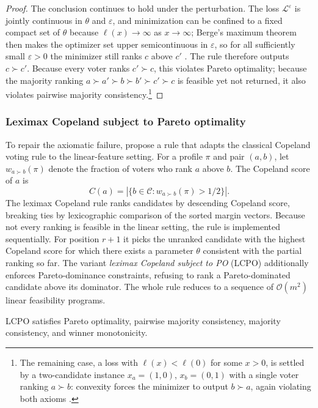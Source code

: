 \begin{proof}
The conclusion continues to hold under the perturbation. The loss $\mathcal{L}^{\varepsilon}$ is jointly continuous in $\theta$ and $\varepsilon$, and minimization can be confined to a fixed compact set of $\theta$ because $\ell(x) \to \infty$ as $x \to \infty$; Berge's maximum theorem then makes the optimizer set upper semicontinuous in $\varepsilon$, so for all sufficiently small $\varepsilon > 0$ the minimizer still ranks $c$ above $c'$ \citep[Lemmas~3.4--3.5]{ge2024axioms}. The rule therefore outputs $c \succ c'$. Because every voter ranks $c' \succ c$, this violates Pareto optimality; because the majority ranking $a \succ a' \succ b \succ b' \succ c' \succ c$ is feasible yet not returned, it also violates pairwise majority consistency.\footnote{The remaining case, a loss with $\ell(x) < \ell(0)$ for some $x > 0$, is settled by a two-candidate instance $x_a = (1,0)$, $x_b = (0,1)$ with a single voter ranking $a \succ b$: convexity forces the minimizer to output $b \succ a$, again violating both axioms \citep{ge2024axioms}.}
\end{proof}

\subsubsection{Leximax Copeland subject to Pareto optimality}
\label{sec:lcpo}

To repair the axiomatic failure, \citet{ge2024axioms} propose a rule that adapts the classical Copeland voting rule to the linear-feature setting. For a profile $\pi$ and pair $(a, b)$, let $w_{a \succ b}(\pi)$ denote the fraction of voters who rank $a$ above $b$. The Copeland score of $a$ is
\[
C(a) = |\{b \in \mathcal{C} : w_{a \succ b}(\pi) > 1/2 \}|.
\]
The leximax Copeland rule ranks candidates by descending Copeland score, breaking ties by lexicographic comparison of the sorted margin vectors. Because not every ranking is feasible in the linear setting, the rule is implemented sequentially. For position $r + 1$ it picks the unranked candidate with the highest Copeland score for which there exists a parameter $\theta$ consistent with the partial ranking so far. The variant \emph{leximax Copeland subject to PO} (LCPO) additionally enforces Pareto-dominance constraints, refusing to rank a Pareto-dominated candidate above its dominator. The whole rule reduces to a sequence of $\mathcal{O}(m^2)$ linear feasibility programs.

\begin{theorem}
\label{thm:lcpo}
LCPO satisfies Pareto optimality, pairwise majority consistency, majority consistency, and winner monotonicity.
\end{theorem}

